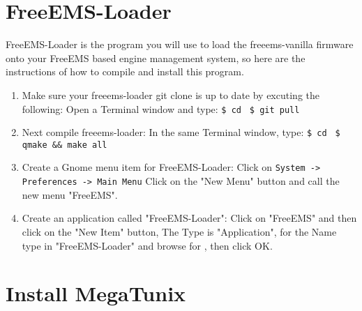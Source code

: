 \documentclass[12pt,notitlepage,onecolumn,oneside,openany]{memoir}
\begin{document}
\chapter{\textsf{FreeEMS-Loader}}

\textsf{FreeEMS-Loader is the program you will use to load the freeems-vanilla firmware onto your FreeEMS based engine management system, so here are the instructions of how to compile and install this program.} \newline

\begin{enumerate}
\item \textsf{Make sure your freeems-loader git clone is up to date by excuting the following:} \newline
      \textsf{Open a Terminal window and type:} \newline
      \texttt{\$ cd }  \newline
      \texttt{\$ git pull}

\item \textsf{Next compile freeems-loader:} \newline
      \textsf{In the same Terminal window, type:} \newline
      \texttt{\$ cd }  \newline
      \texttt{\$ qmake \&\& make all}

\item \textsf{Create a Gnome menu item for FreeEMS-Loader:} \newline
      \textsf{Click on } \texttt{System -> Preferences -> Main Menu} \newline
      \textsf{Click on the "New Menu" button and call the new menu "FreeEMS".}

\item \textsf{Create an application called "FreeEMS-Loader":} \newline
      \textsf{Click on "FreeEMS" and then click on the "New Item" button,} \newline
      \textsf{The Type is "Application", for the Name type in "FreeEMS-Loader" and browse for} \newline
       \textsf{, then click OK.}
\end{enumerate}

\chapter{\textsf{Install MegaTunix}}
\end{document}
